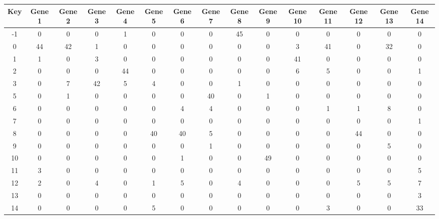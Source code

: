 \begin{tabular}{|c|c|c|c|c|c|c|c|c|c|c|c|c|c|c|}
\hline
Key & Gene 1 & Gene 2 & Gene 3 & Gene 4 & Gene 5 & Gene 6 & Gene 7 & Gene 8 & Gene 9 & Gene 10 & Gene 11 & Gene 12 & Gene 13 & Gene 14 \\
\hline
-1 & 0 & 0 & 0 & 1 & 0 & 0 & 0 & 45 & 0 & 0 & 0 & 0 & 0 & 0 \\
0 & 44 & 42 & 1 & 0 & 0 & 0 & 0 & 0 & 0 & 3 & 41 & 0 & 32 & 0 \\
1 & 1 & 0 & 3 & 0 & 0 & 0 & 0 & 0 & 0 & 41 & 0 & 0 & 0 & 0 \\
2 & 0 & 0 & 0 & 44 & 0 & 0 & 0 & 0 & 0 & 6 & 5 & 0 & 0 & 1 \\
3 & 0 & 7 & 42 & 5 & 4 & 0 & 0 & 1 & 0 & 0 & 0 & 0 & 0 & 0 \\
5 & 0 & 1 & 0 & 0 & 0 & 0 & 40 & 0 & 1 & 0 & 0 & 0 & 0 & 0 \\
6 & 0 & 0 & 0 & 0 & 0 & 4 & 4 & 0 & 0 & 0 & 1 & 1 & 8 & 0 \\
7 & 0 & 0 & 0 & 0 & 0 & 0 & 0 & 0 & 0 & 0 & 0 & 0 & 0 & 1 \\
8 & 0 & 0 & 0 & 0 & 40 & 40 & 5 & 0 & 0 & 0 & 0 & 44 & 0 & 0 \\
9 & 0 & 0 & 0 & 0 & 0 & 0 & 1 & 0 & 0 & 0 & 0 & 0 & 5 & 0 \\
10 & 0 & 0 & 0 & 0 & 0 & 1 & 0 & 0 & 49 & 0 & 0 & 0 & 0 & 0 \\
11 & 3 & 0 & 0 & 0 & 0 & 0 & 0 & 0 & 0 & 0 & 0 & 0 & 0 & 5 \\
12 & 2 & 0 & 4 & 0 & 1 & 5 & 0 & 4 & 0 & 0 & 0 & 5 & 5 & 7 \\
13 & 0 & 0 & 0 & 0 & 0 & 0 & 0 & 0 & 0 & 0 & 0 & 0 & 0 & 3 \\
14 & 0 & 0 & 0 & 0 & 5 & 0 & 0 & 0 & 0 & 0 & 3 & 0 & 0 & 33 \\
\hline
\end{tabular}
